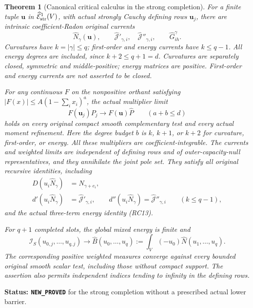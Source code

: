 \documentclass[11pt,a4paper]{article}
\numberwithin{equation}{section}
\newtheorem{theorem}{Theorem}[section]
\theoremstyle{definition}
\theoremstyle{remark}
\begin{document}
\begin{theorem}[Canonical critical calculus in the strong completion]
\label{thm:r11-strong-completed-calculus}
For a finite tuple $\mathbf u$ in
$\widehat{\mathcal E}^1_{\rm str}(V)$, with actual strongly
Cauchy defining rows $\mathbf u_j$, there are intrinsic
coefficient-Radon original currents
\[
 \widehat N_\gamma(\mathbf u),\qquad
 \widehat{\mathcal J}'_{\gamma,i},\quad
 \widehat{\mathcal J}''_{\gamma,i},\qquad
 \widehat G^\gamma_{ih}.
 \tag{IC10}
\]
Curvatures have $k=|\gamma|\leq q$; first-order and energy
currents have $k\leq q-1$. All energy degrees are included,
since $k+2\leq q+1=d$. Curvatures are separately closed,
symmetric and middle-positive; energy matrices are positive.
First-order and energy currents are not asserted to be closed.

For any continuous $F$ on the nonpositive orthant satisfying
$|F(x)|\leq A(1-\sum_i x_i)^a$, the actual multiplier limit
\[
                  F(\mathbf u_j)P_j
                         \longrightarrow F(\mathbf u)\widehat P
       \qquad(a+b\leq d)
 \tag{IC11}
\]
holds on every original compact smooth complementary test and
every actual moment refinement. Here the degree budget $b$ is
$k$, $k+1$, or $k+2$ for curvature, first-order, or energy.
All these multipliers are coefficient-integrable. The currents
and weighted limits are independent of defining rows and of
outer-capacity-null representatives, and they annihilate the
joint pole set. They satisfy all original recursive identities,
including
\[
 \begin{split}
 D(u_i\widehat N_\gamma)&=\widehat N_{\gamma+e_i},\\
 d'(u_i\widehat N_\gamma)&=\widehat{\mathcal J}'_{\gamma,i},\qquad
 d''(u_i\widehat N_\gamma)=\widehat{\mathcal J}''_{\gamma,i}
                         \qquad(k\leq q-1),
 \end{split}
 \tag{IC12}
\]
and the actual three-term energy identity (RC13).

For $q+1$ completed slots, the global mixed energy is finite and
\[
 \mathcal I_S(u_{0,j},\ldots,u_{q,j})
      \longrightarrow
 \widehat B(u_0,\ldots,u_q)
       :=\int_V(-u_0)\widehat N(u_1,\ldots,u_q).
 \tag{IC13}
\]
The corresponding positive weighted measures converge against
every bounded original smooth scalar test, including those
without compact support. The assertion also permits independent
indices tending to infinity in the defining rows.
\end{theorem}

\noindent\textbf{Status: \texttt{NEW\_PROVED}} for the strong
completion without a prescribed actual lower barrier.
\end{document}
